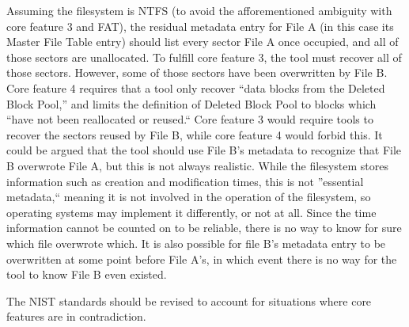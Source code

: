 Assuming the filesystem is NTFS (to avoid the afforementioned ambiguity with core feature 3 and FAT), the residual metadata entry for File A (in this case its Master File Table entry) should list every sector File A once occupied, and all of those sectors are unallocated. 
To fulfill core feature 3, the tool must recover all of those sectors. 
However, some of those sectors have been overwritten by File B. Core feature 4 requires that a tool only recover ``data blocks from the Deleted Block Pool,''\cite{meta:dfr:standards} and limits the definition of Deleted Block Pool to blocks which ``have not been reallocated or reused.``\cite{meta:dfr:standards}
Core feature 3 would require tools to recover the sectors reused by File B, while core feature 4 would forbid this. 
It could be argued that the tool should use File B's metadata to recognize that File B overwrote File A, but this is not always realistic. 
While the filesystem stores information such as creation and modification times, this is not ''essential metadata,`` meaning it is not involved in the operation of the filesystem, so operating systems may implement it differently, or not at all. %
Since the time information cannot be counted on to be reliable, there is no way to know for sure which file overwrote which. It is also possible for file B's metadata entry to be overwritten at some point before File A's, in which event there is no way for the tool to know File B even existed.

The NIST standards should be revised to account for situations where core features are in contradiction.
